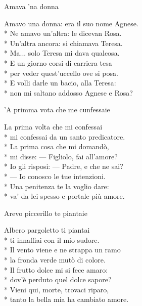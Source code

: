 \documentclass[11pt]{book}
\begin{document}
\begin{poem}{Amava ’na donna}{}
\settowidth{\versewidth}{Amavo una donna: era il suo nome Agnese}
\begin{altverse}
Amavo una donna: era il suo nome Agnese.\\*
Ne amavo un’altra: le dicevan Rosa.\\*
Un’altra ancora: si chiamava Teresa.\\*
Ma... solo Teresa mi dava qualcosa.\\*
E un giorno corsi di carriera tesa\\*
per veder quest’uccello ove si posa.\\*
E volli darle un bacio, alla Teresa:\\*
non mi saltano addosso Agnese e Rosa?
\end{altverse}
\end{poem}

\begin{poem}{’A primma vota che me cunfessaie}{}
\settowidth{\versewidth}{Io gli risposi: — Padre, e che ne sai?}
\begin{altverse}
La prima volta che mi confessai\\*
mi confessai da un santo predicatore.\\*
La prima cosa che mi domandò,\\*
mi disse: — Figliolo, fai all’amore?\\*
Io gli risposi: — Padre, e che ne sai?\\*
— Io conosco le tue intenzioni.\\*
Una penitenza te la voglio dare:\\*
va’ da lei spesso e portale più amore.
\end{altverse}
\end{poem}

\begin{poem}{Arevo piccerillo te piantaie}{}
\settowidth{\versewidth}{Tanto la bella mia ha cambiato amore}
\begin{altverse}
Albero pargoletto ti piantai\\*
ti innaffiai con il mio sudore.\\*
Il vento viene e ne strappa un ramo\\*
la fronda verde mutò di colore.\\*
Il frutto dolce mi si fece amaro:\\*
dov’è perduto quel dolce sapore?\\*
Vieni qui, morte, trovaci riparo,\\*
tanto la bella mia ha cambiato amore.
\end{altverse}
\end{poem}
\end{document}
